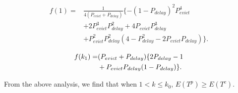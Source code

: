 \begin{enumerate}
  \begin{equation}
  \label{equ:f1}
  \begin{split}
    f(1) =& \frac{1}{4(P_{evict}+P_{delay})}\{-(1-P_{delay})^{2}P_{evict}^{4}\\ & + 2P_{evict}^{3}P_{delay}^{2} + 4P_{evict}P_{delay}^{3} \\ &+ P_{evict}^{2}P_{delay}^{2}(4-P_{delay}^{2} - 2P_{evict}P_{delay})\}.
  \end{split}\end{equation}%

  \begin{equation}
  \label{equ:fk1}
    \raggedleft
  \begin{split}
    f(k_{1}) = &(P_{evict}+P_{delay})\{2P_{delay}- 1\\ & + P_{evict}P_{delay}(1 - P_{delay})\}.
  \end{split}\end{equation}




\end{enumerate}
From the above analysis, we find that when $1< k \leq k_{0}$, $E(T^{p}) \geq E(T^{c})$.

